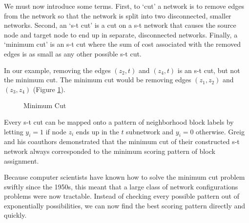 We must now introduce some terms. First, to `cut' a network is to
remove edges from the network so that the network is split into two
disconnected, smaller networks. Second, an `s-t cut' is a cut on a s-t
network that causes the source node and target node to end up in
separate, disconnected networks. Finally, a `minimum cut' is an s-t cut
where the sum of cost associated with the removed edges is as small as
any other possible s-t cut. 

In our example, removing the edges $(z_2, t)$ and $(z_4, t)$ is an s-t
cut, but not the minimum cut. The minimum cut would be removing edges
$(z_1, z_2)$ and $(z_3, z_4)$ (Figure \ref{fig:mincut}).

\begin{figure}[!h]
\centering

\caption{Minimum Cut}
\label{fig:mincut}
\end{figure}

Every s-t cut can be mapped onto a pattern of neighborhood block
labels by letting $y_i = 1$ if node $z_i$ ends up in the $t$
subnetwork and $y_i = 0$ otherwise. Greig and his coauthors
demonstrated that the minimum cut of their constructed s-t network
always corresponded to the minimum scoring pattern of block
assignment.

Because computer scientists have known how to solve the minimum cut
problem swiftly since the 1950s, this meant that a large class of
network configurations problems were now tractable. Instead of
checking every possible pattern out of exponentially possibilities, we
can now find the best scoring pattern directly and
quickly.\cite{ford_maximal_1956}

